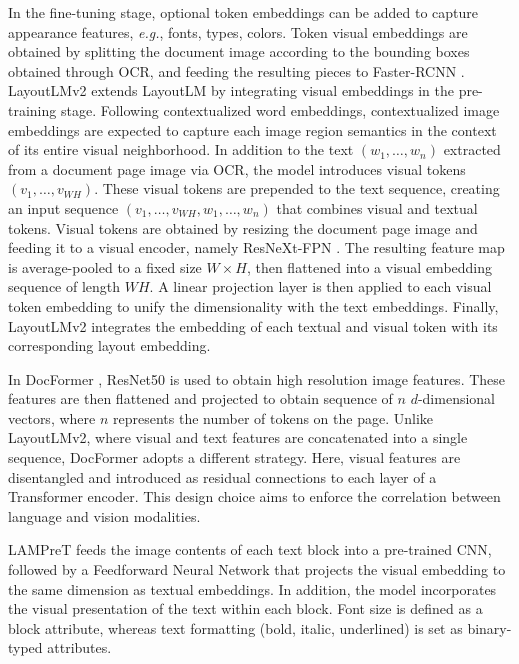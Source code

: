 In the fine-tuning stage, optional token embeddings can be added to capture appearance features, \textit{e.g.}, fonts, types, colors. Token visual embeddings are obtained by splitting the document image according to the bounding boxes obtained through \ac{OCR}, and feeding the resulting pieces to Faster-RCNN \citep{ren2015faster}. LayoutLMv2 \citep{xu2020layoutlmv2} extends LayoutLM by integrating visual embeddings in the pre-training stage. Following contextualized word embeddings, contextualized image embeddings are expected to capture each image region semantics in the context of its entire visual neighborhood. In addition to the text $(w_1, \ldots, w_n)$ extracted from a document page image via \ac{OCR}, the model introduces visual tokens $(v_1, \ldots, v_{WH})$. These visual tokens are prepended to the text sequence, creating an input sequence $(v_1, \ldots, v_{WH}, w_1, \ldots, w_n)$ that combines visual and textual tokens. Visual tokens are obtained by resizing the document page image and feeding it to a visual encoder, namely ResNeXt-FPN \citep{xie2017aggregated, lin2017feature}. The resulting feature map is average-pooled to a fixed size $W \times H$, then flattened into a visual embedding sequence of length $WH$. A linear projection layer is then applied to each visual token embedding to unify the dimensionality with the text embeddings. Finally, LayoutLMv2 integrates the embedding of
each textual and visual token with its corresponding layout embedding. 

In DocFormer \citep{appalaraju2021docformer}, ResNet50 \citep{he2016deep} is used to obtain high resolution image features. These features are then flattened and projected to obtain sequence of $n$ $d$-dimensional vectors, where $n$ represents the number of tokens on the page. Unlike LayoutLMv2, where visual and text features are concatenated into a single sequence, DocFormer adopts a different strategy. Here, visual features are disentangled and introduced as residual connections to each layer of a Transformer encoder. This design choice aims to enforce the correlation between language and vision modalities. 

\ac{LAMPreT} \citep{wu2021lampret} feeds the image contents of each text block into a pre-trained \ac{CNN}, followed by a Feedforward Neural Network that projects the visual embedding to the same dimension as textual embeddings. In addition, the model incorporates the visual presentation of the text within each block. Font size is defined as a block attribute, whereas text formatting (bold, italic, underlined) is set as binary-typed attributes. 

